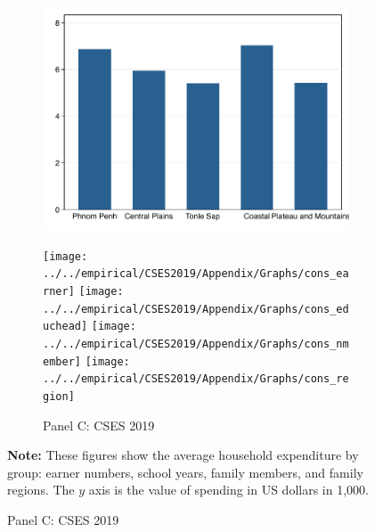 \documentclass[11pt,letterpaper]{article}
\begin{document}
\begin{figure}[H]
\begin{subfigure}[b]{0.33\linewidth}
		\includegraphics[width=1\linewidth]{../../empirical/CSES2017/Appendix/Graphs/cons_region} 
		\vspace{-2.5em}
		\newline {}
	\end{subfigure}
	\hfil
	\begin{subfigure}[b]{0.33\linewidth}
		\caption*{Panel C: CSES 2019} \vspace{-.5em}
		\label{fig:3c}
		\texttt{[image: ../../empirical/CSES2019/Appendix/Graphs/cons\_earner]} 
		\vspace{-2.5em}
		\newline {}
		\texttt{[image: ../../empirical/CSES2019/Appendix/Graphs/cons\_educhead]} 
		\vspace{-2.5em}
		\newline {}
		\texttt{[image: ../../empirical/CSES2019/Appendix/Graphs/cons\_nmember]} 
		\vspace{-2.5em}
		\newline {}
		\texttt{[image: ../../empirical/CSES2019/Appendix/Graphs/cons\_region]} 
		\vspace{-2.5em}
		\newline {}
	\end{subfigure}
	
		\begin{tablenotes}
		\footnotesize
		\item \textbf{Note:} These figures show the average household expenditure by group: earner numbers, school years, family members, and family regions. The $y$ axis is the value of spending in US dollars in 1,000. 
		
	\end{tablenotes} 
\end{figure}
\end{document}
